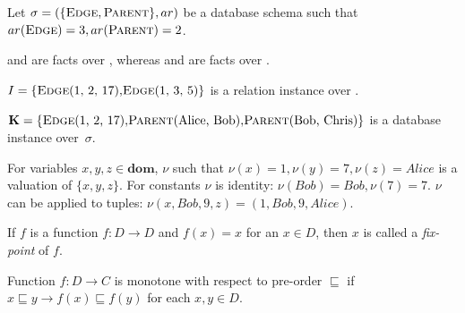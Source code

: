 \begin{exmp}
Let $\sigma = (\{\textsc{Edge}, \textsc{Parent}\}, ar)$ be a database schema such that $ar(\textsc{Edge}) = 3, ar(\textsc{Parent}) = 2$. 

 and  are facts over , whereas  and  are facts over . 

$I = \{\relat{Edge}{(1, 2, 17)}, \relat{Edge}{(1, 3, 5)}\}$ is a relation instance over .

$\textbf{K} = \{\relat{Edge}{(1, 2, 17)}, \relat{Parent}{(Alice, Bob)}, \relat{Parent}{(Bob, Chris)}\}$ is a database instance over~$\sigma$.

For variables $x, y, z \in \textbf{dom}$, $\nu$ such that $\nu(x) = 1, \nu(y) = 7, \nu(z) = Alice$ is a valuation of $\{x, y, z\}$. For constants $\nu$ is identity: $\nu(Bob) = Bob, \nu(7) = 7$. $\nu$ can be applied to tuples: $\nu(x, Bob, 9, z) = (1, Bob, 9, Alice)$.

\end{exmp}

\begin{defn}
If $f$ is a function $f: D \to D$ and $f(x) = x$ for an $x \in D$, then $x$ is called a \emph{fix-point} of $f$.
\end{defn}


\begin{defn}[Monotonicity]
Function $f: D \to C$ is monotone with respect to pre-order $\sqsubseteq$ if $x \sqsubseteq y \rightarrow f(x) \sqsubseteq f(y)$ for each $x, y \in D$.
\end{defn}

